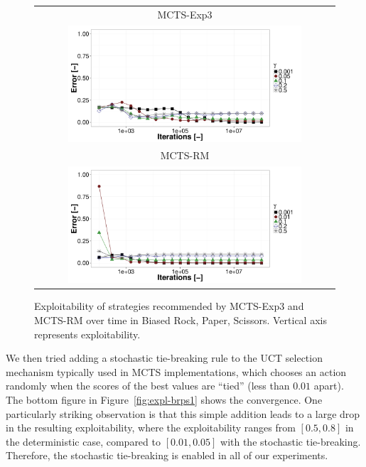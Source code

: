 \begin{figure}[t!]
\centering
\begin{tabular}{c}
{\small MCTS-Exp3} \\
\includegraphics[width=0.8\textwidth]{figures/brps-MCTS-EXP3.pdf} \\
{\small MCTS-RM} \\
\includegraphics[width=0.8\textwidth]{figures/brps-MCTS-RM.pdf} \\
\end{tabular}
\caption{Exploitability of strategies recommended by MCTS-Exp3 and MCTS-RM over time in Biased Rock, Paper, Scissors. Vertical axis represents exploitability. }
\label{fig:expl-brps2}
\end{figure}

We then tried adding a stochastic tie-breaking rule to the UCT selection mechanism typically used in MCTS implementations, which chooses an
action randomly when the scores of the best values are ``tied'' (less than $0.01$ apart).
The bottom figure in Figure~\ref{fig:expl-brps1} shows the convergence.
One particularly striking observation is that this simple addition leads to a large drop in the resulting exploitability, where the exploitability
ranges from $[0.5,0.8]$ in the deterministic case, compared to $[0.01,0.05]$ with the	 stochastic tie-breaking. Therefore, the stochastic tie-breaking is
enabled in all of our experiments.

